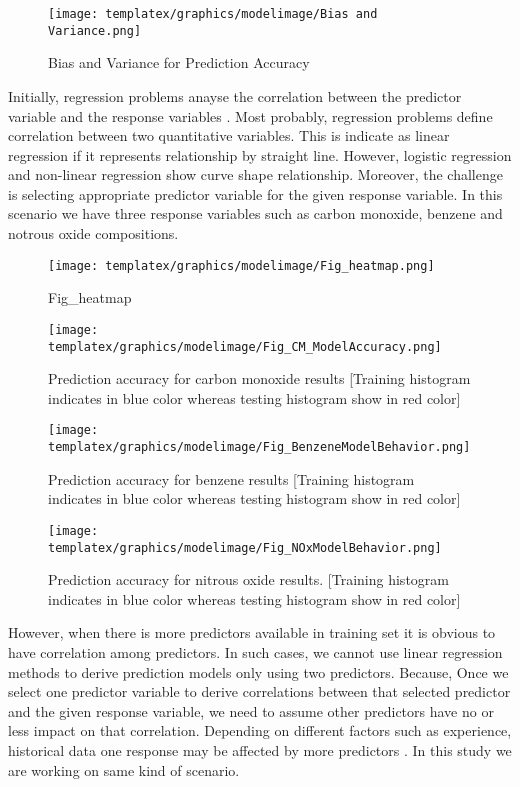 \begin{figure}[hbt!]
\centering
\texttt{[image: templatex/graphics/modelimage/Bias and Variance.png]}
\caption{Bias and Variance for Prediction Accuracy \cite{Bias2020} }
\label{Fig_BiasVariance}
\end{figure}


Initially, regression problems 
anayse the correlation between 
the predictor variable and the response variables \cite{uyanik2013study}.
Most probably, regression problems define correlation 
between two quantitative variables.
This is indicate as linear regression if it represents 
relationship by straight line. 
However, logistic regression and non-linear regression show curve shape relationship. 
Moreover, the challenge is 
selecting appropriate predictor 
variable for the given response variable. 
In this scenario we have three 
response variables such as 
carbon monoxide, benzene and notrous oxide compositions.


\begin{figure}[h!]
\centering
\texttt{[image: templatex/graphics/modelimage/Fig\_heatmap.png]}
\caption{Fig_heatmap }
\label{Fig_heatmap}
\end{figure}


\begin{figure}[hbt]
\centering
\texttt{[image: templatex/graphics/modelimage/Fig\_CM\_ModelAccuracy.png]}
\caption{Prediction accuracy for carbon monoxide results [Training histogram indicates in blue color whereas testing histogram show in red color]}
\label{Fig_Predcarbon monoxide}
\end{figure}

\begin{figure}[hbt]
\centering
\texttt{[image: templatex/graphics/modelimage/Fig\_BenzeneModelBehavior.png]}
\caption{Prediction accuracy for benzene results [Training histogram indicates in blue color whereas testing histogram show in red color]}
\label{Fig_Predbenzene}
\end{figure}

\begin{figure}[hbt]
\centering
\texttt{[image: templatex/graphics/modelimage/Fig\_NOxModelBehavior.png]}
\caption{Prediction accuracy for nitrous oxide results. [Training histogram indicates in blue color whereas testing histogram show in red color]}
\label{Fig_Prednitrousoxide}
\end{figure}
However, when there is more predictors available in training set it is obvious to have correlation among predictors. 
In such cases, we cannot use linear regression methods to 
derive prediction models only using two predictors.
Because, Once we select one predictor variable to derive 
correlations between that 
selected predictor and the given response variable, we need to 
assume other predictors have no or less impact on that correlation.
Depending on different factors such as experience, historical 
data one response may be affected by more predictors \cite{seber2012linear}. 
In this study we are working on same kind of scenario.

